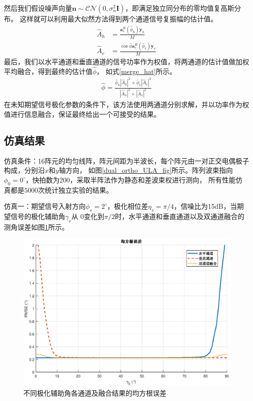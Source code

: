 \documentclass[master]{thesis-uestc}
\begin{document}
然后我们假设噪声向量$\bm{n}\sim\mathcal{CN}(0,\sigma_n^2\bm{I})$，即满足独立同分布的零均值复高斯分布。
这样就可以利用最大似然方法得到两个通道信号复振幅的估计值\cite{Ma}。
\begin{subequations}\label{dual_amp_hat}
    \begin{align}
        \hat{A}_h &= \frac{\bm{a}_s^H(\hat{\phi}_h)\bm{y}_h}{M} \\
        \hat{A}_v &= \frac{\cos\hat{\phi}\bm{a}_s^H(\hat{\phi}_v)\bm{y}_v}{M}
    \end{align}
\end{subequations}
最后，我们以水平通道和垂直通道的信号功率作为权值，将两通道的估计值做加权平均融合，得到最终的估计值$\hat{\phi}$，
如式\eqref{merge_hat}所示。
\begin{equation}\label{merge_hat}
    \begin{aligned}
        \hat{\phi} = 
        \frac{\hat{\phi}_h\left|\hat{A}_h\right|^2+\hat{\phi}_v\left|\hat{A}_v\right|^2}
        {\left|\hat{A}_h\right|^2+\left|\hat{A}_v\right|^2}
    \end{aligned}
\end{equation}
在未知期望信号极化参数的条件下，该方法使用两通道分别求解，并以功率作为权值进行信息融合，保证最终给出一个可接受的结果。

\subsection{仿真结果}
仿真条件：16阵元的均匀线阵，阵元间距为半波长，每个阵元由一对正交电偶极子构成，分别沿$x$和$y$轴方向，
如图\ref{dual_ortho_ULA_fig}所示。阵列波束指向$\phi_0=0^\circ$，快拍数为200，采取半阵法作为静态和差波束权进行测向，
所有性能仿真都是5000次统计独立实验的结果。

仿真一：期望信号入射方向$\phi_s=2^\circ$，极化相位差$\eta_s=\pi/4$，信噪比为15dB，当期望信号的极化辅助角$\gamma_s$从
$0$变化到$\pi/2$时，水平通道和垂直通道以及双通道融合的测角误差如图\ref{dual_RMSE_gamma}所示。
\begin{figure}[H]
    \includegraphics[scale=0.5]{pic/dual_RMSE_gamma.eps}
    \caption{不同极化辅助角各通道及融合结果的均方根误差}
    \label{dual_RMSE_gamma}
\end{figure}
\end{document}
